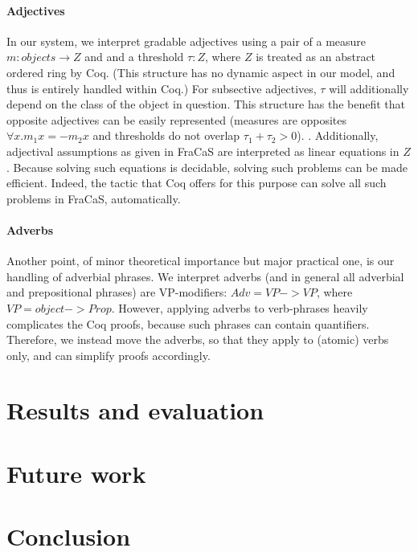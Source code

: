 \documentclass{article}
\begin{document}
\paragraph{Adjectives}
In our system, we interpret gradable adjectives using a pair of a
measure $m : objects → Z$ and and a threshold $τ : Z$, where $Z$ is
treated as an abstract ordered ring by Coq. (This structure has no
dynamic aspect in our model, and thus is entirely handled within Coq.)
For subsective adjectives, $τ$ will additionally depend on the class
of the object in question. This structure has the benefit that
opposite adjectives can be easily represented (measures are opposites
$∀x. m_1 x = -m_2 x$ and thresholds do not overlap $τ_1 + τ_2 > 0$).
.  Additionally,
adjectival assumptions as given in FraCaS are interpreted as linear
equations in $Z$. Because solving such equations is decidable, solving
such problems can be made efficient. Indeed, the tactic that Coq
offers for this purpose can solve all such problems in FraCaS,
automatically.


\paragraph{Adverbs}
Another point, of minor theoretical importance but major practical
one, is our handling of adverbial phrases. We interpret adverbs (and
in general all adverbial and prepositional phrases) are VP-modifiers:
$Adv = VP -> VP$, where $VP = object -> Prop$. However, applying
adverbs to verb-phrases heavily complicates the Coq proofs, because
such phrases can contain quantifiers. Therefore, we instead move the
adverbs, so that they apply to (atomic) verbs only, and can simplify
proofs accordingly. 



\section{Results and evaluation}

\section{Future work}
\section{Conclusion}


\printbibliography
\end{document}
